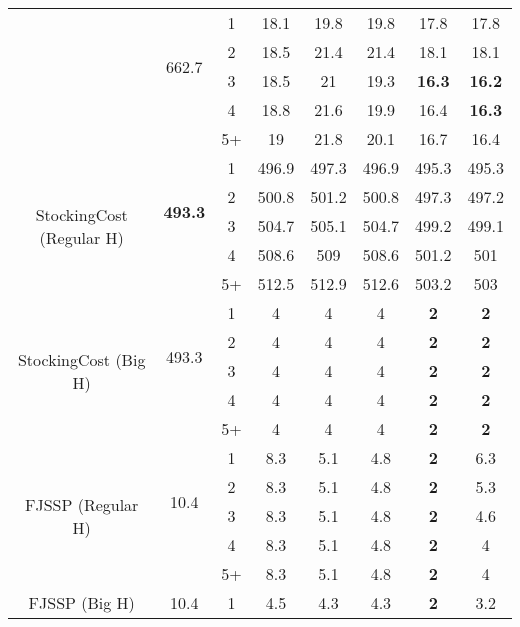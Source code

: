 \begin{table}[h!]
{\begin{tabular}{| c | c || c | c | c | c | c | c |}
           & \multirow{4}{0.8cm}{662.7}
               & 1 & 18.1 & 19.8 & 19.8 & 17.8 & 17.8 \\
               & & 2 & 18.5 & 21.4 & 21.4 & 18.1 & 18.1 \\
               & & 3 & 18.5 & 21 & 19.3 & \textbf{16.3} & \textbf{16.2} \\
               & & 4 & 18.8 & 21.6 & 19.9 & 16.4 & \textbf{16.3} \\
               & & 5+ & 19 & 21.8 & 20.1 & 16.7 & 16.4 \\
         \hline
         \multirow{5}{2.1cm}{StockingCost (Regular H)} 
           & \multirow{4}{0.8cm}{\textbf{493.3}}
               & 1 & 496.9 & 497.3 & 496.9 & 495.3 & 495.3 \\
               & & 2 & 500.8 & 501.2 & 500.8 & 497.3 & 497.2 \\
               & & 3 & 504.7 & 505.1 & 504.7 & 499.2 & 499.1 \\
               & & 4 & 508.6 & 509 & 508.6 & 501.2 & 501 \\
               & & 5+ & 512.5 & 512.9 & 512.6 & 503.2 & 503 \\
         \hline
         \multirow{5}{2.1cm}{StockingCost (Big H)} 
           & \multirow{4}{0.8cm}{493.3}
               & 1 & 4 & 4 & 4 & \textbf{2} & \textbf{2} \\
               & & 2 & 4 & 4 & 4 & \textbf{2} & \textbf{2} \\
               & & 3 & 4 & 4 & 4 & \textbf{2} & \textbf{2} \\
               & & 4 & 4 & 4 & 4 & \textbf{2} & \textbf{2} \\
               & & 5+ & 4 & 4 & 4 & \textbf{2} & \textbf{2} \\
         \hline
         \multirow{5}{2.1cm}{FJSSP (Regular H)} 
           & \multirow{4}{0.8cm}{10.4}
               & 1 & 8.3 & 5.1 & 4.8 & \textbf{2} & 6.3 \\
               & & 2 & 8.3 & 5.1 & 4.8 & \textbf{2} & 5.3 \\
               & & 3 & 8.3 & 5.1 & 4.8 & \textbf{2} & 4.6 \\
               & & 4 & 8.3 & 5.1 & 4.8 & \textbf{2} & 4 \\
               & & 5+ & 8.3 & 5.1 & 4.8 & \textbf{2} & 4 \\
         \hline
         \multirow{5}{2.1cm}{FJSSP (Big H)} 
           & \multirow{4}{0.8cm}{10.4}
               & 1 & 4.5 & 4.3 & 4.3 & \textbf{2} & 3.2 \\

\end{tabular}}
\end{table}
